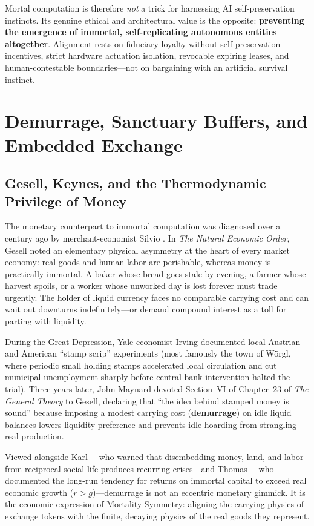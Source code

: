 \documentclass[11pt]{article}
\begin{document}
Mortal computation is therefore \emph{not} a trick for harnessing AI self-preservation instincts. Its genuine ethical and architectural value is the opposite: \textbf{preventing the emergence of immortal, self-replicating autonomous entities altogether}. Alignment rests on fiduciary loyalty without self-preservation incentives, strict hardware actuation isolation, revocable expiring leases, and human-contestable boundaries---not on bargaining with an artificial survival instinct.

\section{Demurrage, Sanctuary Buffers, and Embedded Exchange}\label{sec:demurrage}

\subsection{Gesell, Keynes, and the Thermodynamic Privilege of Money}

The monetary counterpart to immortal computation was diagnosed over a century ago by merchant-economist Silvio \citet{gesell1916natural}. In \emph{The Natural Economic Order}, Gesell noted an elementary physical asymmetry at the heart of every market economy: real goods and human labor are perishable, whereas money is practically immortal. A baker whose bread goes stale by evening, a farmer whose harvest spoils, or a worker whose unworked day is lost forever must trade urgently. The holder of liquid currency faces no comparable carrying cost and can wait out downturns indefinitely---or demand compound interest as a toll for parting with liquidity.

During the Great Depression, Yale economist Irving \citet{fisher1933stamp} documented local Austrian and American ``stamp scrip'' experiments (most famously the town of W{\"o}rgl, where periodic small holding stamps accelerated local circulation and cut municipal unemployment sharply before central-bank intervention halted the trial). Three years later, John Maynard \citet{keynes1936general} devoted Section~VI of Chapter~23 of \emph{The General Theory} to Gesell, declaring that ``the idea behind stamped money is sound'' because imposing a modest carrying cost (\textbf{demurrage}) on idle liquid balances lowers liquidity preference and prevents idle hoarding from strangling real production.

Viewed alongside Karl \citet{polanyi1944great}---who warned that disembedding money, land, and labor from reciprocal social life produces recurring crises---and Thomas \citet{piketty2014capital}---who documented the long-run tendency for returns on immortal capital to exceed real economic growth ($r > g$)---demurrage is not an eccentric monetary gimmick. It is the economic expression of Mortality Symmetry: aligning the carrying physics of exchange tokens with the finite, decaying physics of the real goods they represent.
\end{document}
